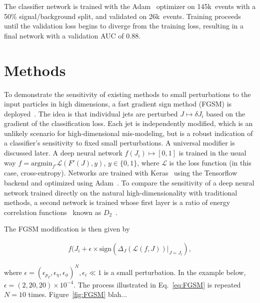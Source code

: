 \documentclass[reprint,nofootinbib,...]{revtex4-1}
\newcommand{\ntrain}{145k}       %
\newcommand{\nval}{26k}            %
\newcommand{\aucCLS}{0.88}    %
\begin{document}
The classifier network is trained with the Adam~\cite{adam} optimizer on \ntrain\ events with a 50\% signal/background split, and validated on \nval\ events.
Training proceeds until the validation loss begins to diverge from the training loss, resulting in a final network with a validation AUC of \aucCLS.

\section{Methods}
To demonstrate the sensitivity of existing methods to small perturbations to the input particles in high dimensions, a fast gradient sign method (FGSM) is deployed~\cite{DBLP:journals/corr/GoodfellowSS14}.  The idea is that individual jets are perturbed $J\mapsto \delta J_i$ based on the gradient of the classification loss.  Each jet is independently modified, which is an unlikely scenario for high-dimensional mis-modeling, but is a robust indication of a classifier's sensitivity to fixed small perturbations.  A universal modifier is discussed later.  A deep neural network $f(J_i)\mapsto [0,1]$ is trained in the usual way $f=\text{argmin}_{f'}\mathcal{L}(F'(J),y)$, $y\in\{0,1\}$, where $\mathcal{L}$ is the loss function (in this case, cross-entropy).  Networks are trained with Keras~\cite{keras} using the Tensorflow~\cite{tensorflow} backend and optimized using Adam~\cite{adam}.  To compare the sensitivity of a deep neural network trained directly on the natural high-dimensionality with traditional methods, a second network is trained whose first layer is a ratio of energy correlation functions~\cite{Larkoski:2013eya} known as $D_2$~\cite{Larkoski:2014gra}.

The FGSM modification is then given by

\begin{align}
\label{eq:FGSM}
f(J_i+\epsilon\times\text{sign}(\Delta_J(\mathcal{L}(f,J))|_{J=J_i}),
\end{align}

\noindent where $\epsilon=(\epsilon_{p_T},\epsilon_\eta,\epsilon_\phi)^N, \epsilon_i\ll1$ is a small perturbation.  In the example below, $\epsilon=(2,20,20)\times 10^{-4}$.  The process illustrated in Eq.~\ref{eq:FGSM} is repeated $N=10$ times.  Figure~\ref{fig:FGSM} blah...
\end{document}
